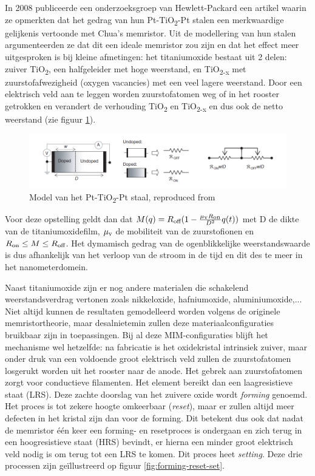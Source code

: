 In 2008 publiceerde een onderzoeksgroep van Hewlett-Packard een artikel waarin ze opmerkten dat het gedrag van hun Pt-TiO\textsubscript{2}-Pt stalen een merkwaardige gelijkenis vertoonde met Chua's memristor.\cite{Str08} Uit de modellering van hun stalen argumenteerden ze dat dit een ideale memristor zou zijn en dat het effect meer uitgesproken is bij kleine afmetingen: het titaniumoxide bestaat uit 2 delen: zuiver TiO\textsubscript{2}, een halfgeleider met hoge weerstand, en TiO\textsubscript{2-x} met zuurstofafwezigheid (oxygen vacancies) met een veel lagere weerstand. Door een elektrisch veld aan te leggen worden zuurstofatomen weg of in het rooster getrokken en verandert de verhouding TiO\textsubscript{2} en TiO\textsubscript{2-x} en dus ook de netto weerstand (zie figuur \ref{fig:HP-model}).

\begin{figure}
  \centering
  \includegraphics[scale=0.5]{../fig/hfdstk-cel-HP-model.png}
  \caption[Model van het Pt-TiO\textsubscript{2}-Pt staal]{Model van het Pt-TiO\textsubscript{2}-Pt staal, reproduced from\cite{Str08}}
  \label{fig:HP-model}
\end{figure}

Voor deze opstelling geldt dan dat $M(q)=R\textsubscript{off}(1-\frac{\mu\textsubscript{v}R\textsubscript{on}}{D^2}q(t))$ met D de dikte van de titaniumoxidefilm, $\mu\textsubscript{v}$ de mobiliteit van de zuurstofionen en $R\textsubscript{on} \leq M \leq R\textsubscript{off}$. Het dymamisch gedrag van de ogenblikkelijke weerstandswaarde is dus afhankelijk van het verloop van de stroom in de tijd en dit des te meer in het nanometerdomein.

Naast titaniumoxide zijn er nog andere materialen die schakelend weerstandsverdrag vertonen zoals nikkeloxide\cite{Bae04}, hafniumoxide\cite{Che11}, aluminiumoxide\cite{Kim06},... Niet altijd kunnen de resultaten gemodelleerd worden volgens de originele memristortheorie, maar desalnietemin zullen deze materiaalconfiguraties bruikbaar zijn in toepassingen.
Bij al deze MIM-configuraties blijft het mechanisme wel hetzelfde: na fabricatie is het oxidekristal intrinsiek zuiver, maar onder druk van een voldoende groot elektrisch veld zullen de zuurstofatomen losgerukt worden uit het rooster naar de anode. Het gebrek aan zuurstofatomen zorgt voor conductieve filamenten. Het element bereikt dan een laagresistieve staat (LRS).
Deze zachte doorslag van het zuivere oxide wordt \emph{forming} genoemd. Het proces is tot zekere hoogte omkeerbaar (\emph{reset}), maar er zullen altijd meer defecten in het kristal zijn dan voor de forming. Dit betekent dus ook dat nadat de memristor één keer een forming- en resetproces is ondergaan en zich terug in een hoogresistieve staat (HRS) bevindt, er hierna een minder groot elektrisch veld nodig is om terug tot een LRS te komen. Dit proces heet \emph{setting}. Deze drie processen zijn geïllustreerd op figuur \ref{fig:forming-reset-set}.

